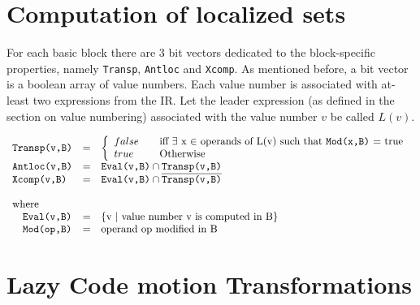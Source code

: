 \appendix

\chapter{Computation of localized sets}
For each basic block there are 3 bit vectors dedicated to the block-specific
properties, namely \texttt{Transp}, \texttt{Antloc} and \texttt{Xcomp}. As mentioned before, a bit vector
is a boolean array of value numbers. Each value number is associated with
at-least two expressions from the IR. Let the leader
expression (as defined in the section on value numbering) associated with the
value number $v$ be called $L(v)$. 


\begin{equation}
\begin{array}{l c l}
\texttt{Transp(v,B)} &=& \left\{
                    \begin{array}{l l}
                        false & \quad \text{iff $\exists$ x $\in$ operands of L(v) such that \texttt{Mod(x,B)} = true}\\
                        true & \quad \text{Otherwise}
                    \end{array} \right. \\
\texttt{Antloc(v,B)} &=& \texttt{Eval(v,B)} \cap \texttt{Transp(v,B)} \\
\texttt{Xcomp(v,B)} &=& \texttt{Eval(v,B)} \cap \overline{\texttt{Transp(v,B)}}\\
  &&\\
\text{where}&& \\  
\quad \texttt{Eval(v,B)} &=& \text{\{v $|$ value number v is computed in B\}}\\
\quad \texttt{Mod(op,B)} &=& \text{operand op modified in B}\\
\end{array}
\end{equation}

\chapter{Lazy Code motion Transformations}

